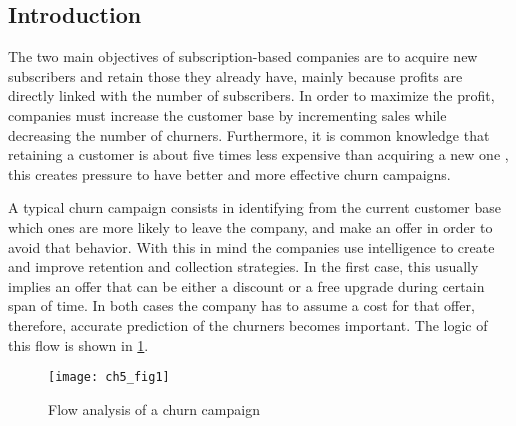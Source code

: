 \subsection{Introduction}
\label{sec:5:1:intro}

The two main objectives of subscription-based companies are to  acquire new subscribers and 
retain those they already have, mainly because profits are directly linked with the number of 
subscribers.  In order to maximize the profit, companies must increase the customer base by 
incrementing sales  while decreasing the number of churners. Furthermore, it is common knowledge 
that retaining a  customer is about five times less expensive than acquiring a new one 
\citep{Farris2010}, this creates  pressure to have better and more effective churn campaigns.

A typical churn campaign consists in identifying from the current customer base which ones are 
more likely to leave the company, and make an offer in order to avoid that behavior.
With this in mind the companies use intelligence to create and improve retention and collection
strategies. In the first case, this usually implies an offer that can be either a discount or a 
free upgrade during certain span of time. In both cases the company has to 	assume a cost for that 
offer, therefore, accurate prediction of the churners becomes important. The logic of this flow is 
shown in \figurename{ \ref{fig:ch5:1}}.

	\begin{figure}[htbp]
	  \centering
    \texttt{[image: ch5\_fig1]}   %
	  \caption{Flow analysis of a churn campaign \citep{Verbraken2012}}
	  \label{fig:ch5:1}
	\end{figure}

